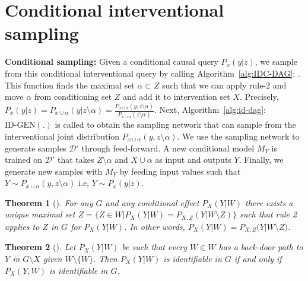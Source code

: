 \documentclass{article}
\newcommand{\data}{\mathcal{D}}
\newcommand{\idgen}{\text{ID-GEN}\xspace}
\newcommand{\idcdag}{\text{IDC-GEN}\xspace}
\theoremstyle{plain}
\newtheorem{theorem}{Theorem}[section]
\theoremstyle{definition}
\theoremstyle{remark}
\begin{document}
	\section{Conditional interventional sampling}
	
	\label{appex:cond-intv-samp}
	\textbf{Conditional sampling:}
	Given a conditional causal query $P_{x}({y}|{z})$,
	we sample from this conditional interventional query by calling Algorithm~\ref{alg:IDC-DAG}: \idcdag. 
	This function finds the maximal set ${\alpha }\subset {Z}$ such that we can apply rule-2 and move ${\alpha}$ from conditioning set ${Z}$ and add it to intervention set ${X}$. Precisely, $P_{{x}}({y}|{z})= P_{{x\cup \alpha}}({y}|{z\setminus \alpha}) =  \frac{P_{{x\cup \alpha}}({y},{z\setminus \alpha})}{P_{{x\cup \alpha}}({z\setminus \alpha})} $. 
	Next, Algorithm~\ref{alg:id-dag}: $\mathrm{\idgen(.)}$ is called to obtain the sampling network that can sample from the interventional joint distribution $P_{{x\cup \alpha}}({y},{z\setminus \alpha})$. 
	We use the sampling network to generate samples $\data'$ through feed-forward.
	A new conditional model $M_{{Y}}$ is trained on $\data'$ that takes ${Z\setminus \alpha}$ and $X\cup \alpha$ as input and outputs ${Y}$. Finally, we generate new samples with $M_{{Y}}$ by feeding input values such that $Y\sim P_{{x\cup \alpha}}({y},{z\setminus \alpha})$ i.e,  $Y\sim P_{x}(y|z)$.
	
	
	
	
	
	
	\begin{theorem}[\citet{shpitser2008complete}]
		\label{theorem20}
		For any $G$ and any conditional effect $P_{{X}}({Y}|{W})$ there exists a unique maximal set
		${Z}= \{Z \in {W}|P_{{X}}({Y}|{W}) = P_{{X,Z}}({Y|W} \setminus {Z})\}$ such that rule 2 applies to ${Z}$ in $G$ for $P_{{X}}({Y}|{W})$. In other words, $P_{{X}}({Y}|{W}) = P_{{X,Z}}({Y|W \setminus Z)}$.
	\end{theorem}
	
	
	\begin{theorem}[\citet{shpitser2008complete}]
		\label{theorem21}
		Let $P_{{X}}({Y}|{W})$ be such that every $W \in  {W} $ has a back-door path to $Y$ in $G\setminus {X}$ given
		${W}\setminus \{W\}$. Then $P_{{X}}({Y|W})$ is identifiable in $G$ if and only if $P_{{X}}({Y, W})$ is identifiable in $G$.
	\end{theorem}
	
	
	
\end{document}
